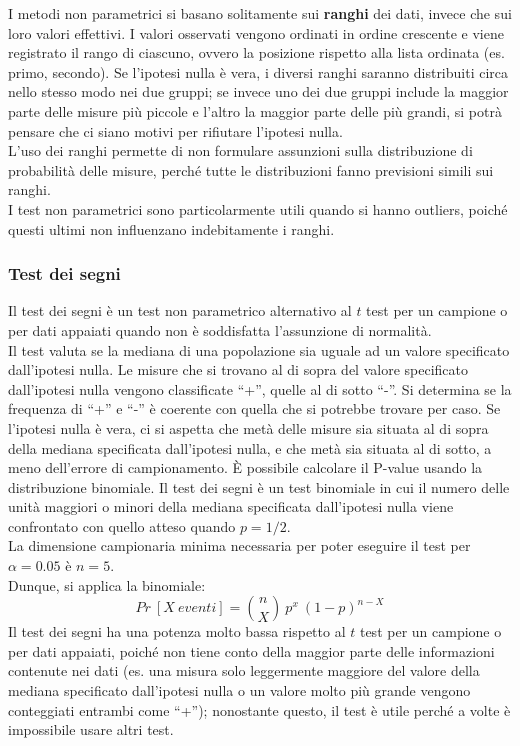 \documentclass[10pt, draft]{book}
\begin{document}
I metodi non parametrici si basano solitamente sui \textbf{ranghi} dei dati, invece che sui loro valori effettivi. I valori osservati vengono ordinati in ordine crescente e viene registrato il rango di ciascuno, ovvero la posizione rispetto alla lista ordinata (es. primo, secondo). Se l'ipotesi nulla è vera, i diversi ranghi saranno distribuiti circa nello stesso modo nei due gruppi; se invece uno dei due gruppi include la maggior parte delle misure più piccole e l'altro la maggior parte delle più grandi, si potrà pensare che ci siano motivi per rifiutare l'ipotesi nulla.\\
L'uso dei ranghi permette di non formulare assunzioni sulla distribuzione di probabilità delle misure, perché tutte le distribuzioni fanno previsioni simili sui ranghi.\\
I test non parametrici sono particolarmente utili quando si hanno outliers, poiché questi ultimi non influenzano indebitamente i ranghi.

\subsubsection{Test dei segni}

Il test dei segni è un test non parametrico alternativo al $t$ test per un campione o per dati appaiati quando non è soddisfatta l'assunzione di normalità.\\
Il test valuta se la mediana di una popolazione sia uguale ad un valore specificato dall'ipotesi nulla. Le misure che si trovano al di sopra del valore specificato dall'ipotesi nulla vengono classificate ``+'', quelle al di sotto ``-''. Si determina se la frequenza di ``+'' e ``-'' è coerente con quella che si potrebbe trovare per caso. Se l'ipotesi nulla è vera, ci si aspetta che metà delle misure sia situata al di sopra della mediana specificata dall'ipotesi nulla, e che metà sia situata al di sotto, a meno dell'errore di campionamento. È possibile calcolare il P-value usando la distribuzione binomiale. Il test dei segni è un test binomiale in cui il numero delle unità maggiori o minori della mediana specificata dall'ipotesi nulla viene confrontato con quello atteso quando $p = 1/2$.\\
La dimensione campionaria minima necessaria per poter eseguire il test per $\alpha = 0.05$ è $n = 5$.\\
Dunque, si applica la binomiale:
\begin{equation}
    Pr\ [X\ eventi] = \binom{n}{X}\ p^x\ (1-p)^{n-X}
\end{equation}
Il test dei segni ha una potenza molto bassa rispetto al $t$ test per un campione o per dati appaiati, poiché non tiene conto della maggior parte delle informazioni contenute nei dati (es. una misura solo leggermente maggiore del valore della mediana specificato dall'ipotesi nulla o un valore molto più grande vengono conteggiati entrambi come ``+''); nonostante questo, il test è utile perché a volte è impossibile usare altri test.
\end{document}
